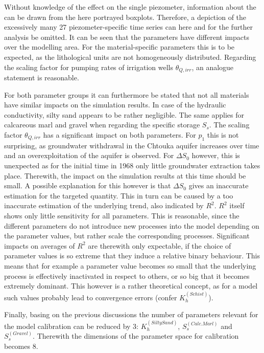 Without knowledge of the effect on the single piezometer, information about the can be drawn from the here portrayed boxplots. Therefore, a depiction of the excessively many 27 piezometer-specific time series can here and for the further analysis be omitted. It can be seen that the parameters have different impacts over the modelling area. For the material-specific parameters this is to be expected, as the lithological units are not homogeneously distributed. Regarding the scaling factor for pumping rates of irrigation wells $\theta_{Q,irr}$, an analogue statement is reasonable.

For both parameter groups it can furthermore be stated that not all materials have similar impacts on the simulation results. In case of the hydraulic conductivity, silty sand appears to be rather negligible. The same applies for calcareous marl and gravel when regarding the specific storage $S_s$. The scaling factor $\theta_{Q,irr}$ has a significant impact on both parameters. For $p_1$ this is not surprising, as groundwater withdrawal in the Chtouka aquifer increases over time and an overexploitation of the aquifer is observed. For $\Delta S_0$ however, this is unexpected as for the initial time in 1968 only little groundwater extraction takes place. Therewith, the impact on the simulation results at this time should be small. A possible explanation for this however is that $\Delta S_0$ gives an inaccurate estimation for the targeted quantity. This in turn can be caused by a too inaccurate estimation of the underlying trend, also indicated by $R^2$. $R^2$ itself shows only little sensitivity for all parameters. This is reasonable, since the different parameters do not introduce new processes into the model depending on the parameter values, but rather scale the corresponding processes. Significant impacts on averages of $R^2$ are therewith only expectable, if the choice of parameter values is so extreme that they induce a relative binary behaviour. This means that for example a parameter value becomes so small that the underlying process is effectively inactivated in respect to others, or so big that it becomes extremely dominant. This however is a rather theoretical concept, as for a model such values probably lead to convergence errors (confer $K_h^{(Schist)}$).

Finally, basing on the previous discussions the number of parameters relevant for the model calibration can be reduced by 3: $K_h^{(Silty Sand)}$, $S_s^{(Calc. Marl)}$ and $S_s^{(Gravel)}$. Therewith the dimensions of the parameter space for calibration becomes 8.

